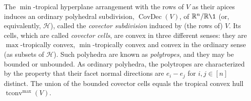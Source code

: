\documentclass[a4paper,12pt]{amsart}
\newcommand\RR{{\mathbb R}}
\newcommand\cH{{\mathcal H}}
\newcommand\torus[1]{\RR^{#1}/\RR\1} %
\DeclareMathOperator\tconv{tconv}
\DeclareMathOperator\CovDec{CovDec} %
\theoremstyle{remark}
\begin{document}
The $\min$-tropical hyperplane arrangement with the rows of $V$ as their apices induces an ordinary polyhedral subdivision, $\CovDec(V)$, of $\torus{n}$ (or, equivalently, $\cH$), called the \emph{covector subdivision} induced by (the rows of) $V$.
Its cells, which are called \emph{covector cells}, are convex in three different senses: they are $\max$-tropically convex, $\min$-tropically convex and convex in the ordinary sense (as subsets of $\cH$).
Such polyhedra are known as \emph{polytropes}, and they may be bounded or unbounded.
As ordinary polyhedra, the polytropes are characterized by the property that their facet normal directions are $e_i-e_j$ for $i,j\in[n]$ distinct.
The union of the bounded covector cells equals the tropical convex hull $\tconv^{\max}(V)$.

\begin{figure}[th]
  \centering
\end{figure}
\end{document}
